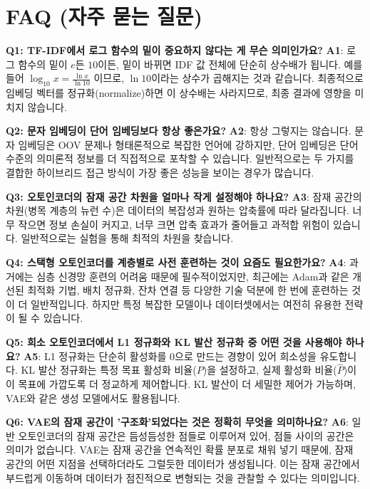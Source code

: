 \documentclass[11pt,a4paper]{article}
\begin{document}
\newpage
\section{FAQ (자주 묻는 질문)}

\begin{tcolorbox}[title=\textbf{Q\&A: 초심자를 위한 질문과 답변}]
\textbf{Q1: TF-IDF에서 로그 함수의 밑이 중요하지 않다는 게 무슨 의미인가요?}
\textbf{A1}: 로그 함수의 밑이 $e$든 $10$이든, 밑이 바뀌면 IDF 값 전체에 단순히 상수배가 됩니다. 예를 들어 $\log_{10} x = \frac{\ln x}{\ln 10}$ 이므로, $\ln 10$이라는 상수가 곱해지는 것과 같습니다. 최종적으로 임베딩 벡터를 정규화(normalize)하면 이 상수배는 사라지므로, 최종 결과에 영향을 미치지 않습니다.

\textbf{Q2: 문자 임베딩이 단어 임베딩보다 항상 좋은가요?}
\textbf{A2}: 항상 그렇지는 않습니다. 문자 임베딩은 OOV 문제나 형태론적으로 복잡한 언어에 강하지만, 단어 임베딩은 단어 수준의 의미론적 정보를 더 직접적으로 포착할 수 있습니다. 일반적으로는 두 가지를 결합한 하이브리드 접근 방식이 가장 좋은 성능을 보이는 경우가 많습니다.

\textbf{Q3: 오토인코더의 잠재 공간 차원을 얼마나 작게 설정해야 하나요?}
\textbf{A3}: 잠재 공간의 차원(병목 계층의 뉴런 수)은 데이터의 복잡성과 원하는 압축률에 따라 달라집니다. 너무 작으면 정보 손실이 커지고, 너무 크면 압축 효과가 줄어들고 과적합 위험이 있습니다. 일반적으로는 실험을 통해 최적의 차원을 찾습니다.

\textbf{Q4: 스택형 오토인코더를 계층별로 사전 훈련하는 것이 요즘도 필요한가요?}
\textbf{A4}: 과거에는 심층 신경망 훈련의 어려움 때문에 필수적이었지만, 최근에는 Adam과 같은 개선된 최적화 기법, 배치 정규화, 잔차 연결 등 다양한 기술 덕분에 한 번에 훈련하는 것이 더 일반적입니다. 하지만 특정 복잡한 모델이나 데이터셋에서는 여전히 유용한 전략이 될 수 있습니다.

\textbf{Q5: 희소 오토인코더에서 L1 정규화와 KL 발산 정규화 중 어떤 것을 사용해야 하나요?}
\textbf{A5}: L1 정규화는 단순히 활성화를 0으로 만드는 경향이 있어 희소성을 유도합니다. KL 발산 정규화는 특정 목표 활성화 비율($P$)을 설정하고, 실제 활성화 비율($\hat{P}$)이 이 목표에 가깝도록 더 정교하게 제어합니다. KL 발산이 더 세밀한 제어가 가능하며, VAE와 같은 생성 모델에서도 활용됩니다.

\textbf{Q6: VAE의 잠재 공간이 '구조화'되었다는 것은 정확히 무엇을 의미하나요?}
\textbf{A6}: 일반 오토인코더의 잠재 공간은 듬성듬성한 점들로 이루어져 있어, 점들 사이의 공간은 의미가 없습니다. VAE는 잠재 공간을 연속적인 확률 분포로 채워 넣기 때문에, 잠재 공간의 어떤 지점을 선택하더라도 그럴듯한 데이터가 생성됩니다. 이는 잠재 공간에서 부드럽게 이동하며 데이터가 점진적으로 변형되는 것을 관찰할 수 있다는 의미입니다.
\end{tcolorbox}
\end{document}
